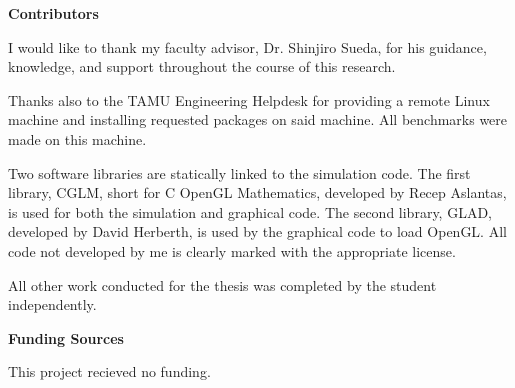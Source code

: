 
\noindent\textbf{Contributors} %

\indent\indent I would like to thank my faculty advisor, Dr. Shinjiro Sueda,
for his guidance, knowledge, and support throughout the course of this research.

\indent\indent Thanks also to the TAMU Engineering Helpdesk for providing a remote Linux machine and installing requested packages on said machine. All benchmarks were made on this machine.

\indent\indent Two software libraries are statically linked to the simulation code.
The first library, CGLM, short for C OpenGL Mathematics, developed by Recep Aslantas, is used for both the simulation and graphical code. 
The second library, GLAD, developed by David Herberth, is used by the graphical code to load OpenGL. All code not developed by me is clearly marked with the appropriate license.

\indent\indent All other work conducted for the thesis was 
completed by the student independently.


\noindent\textbf{Funding Sources} %

\indent \indent This project recieved no funding.

\pagebreak{}

